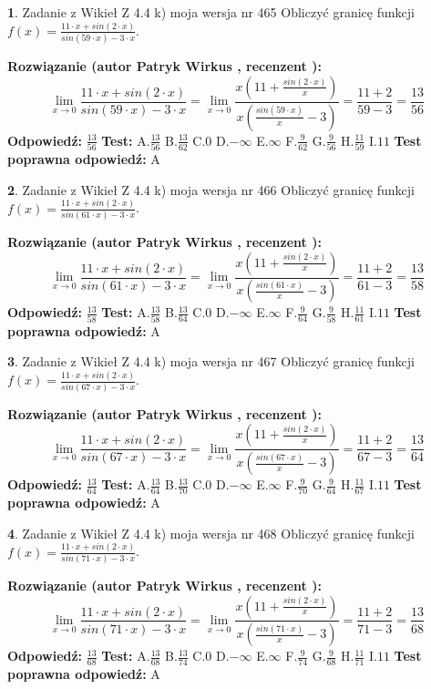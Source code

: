 \documentclass[12pt, a4paper]{article}
\theoremstyle{definition} %
\newtheorem{zad}{}
\newcommand{\zadStart}[1]{\begin{zad}#1\newline}
\newcommand{\zadStop}{\end{zad}}
\newcommand{\rozwStart}[2]{\noindent \textbf{Rozwiązanie (autor #1 , recenzent #2): }\newline}
\newcommand{\rozwStop}{\newline}
\newcommand{\odpStart}{\noindent \textbf{Odpowiedź:}\newline}
\newcommand{\odpStop}{\newline}
\newcommand{\testStart}{\noindent \textbf{Test:}\newline}
\newcommand{\testStop}{\newline}
\newcommand{\kluczStart}{\noindent \textbf{Test poprawna odpowiedź:}\newline}
\newcommand{\kluczStop}{\newline}
\begin{document}
\zadStart{Zadanie z Wikieł Z 4.4 k) moja wersja nr 465}
Obliczyć granicę funkcji $f(x)=\frac{11\cdot x +sin(2\cdot x)}{sin(59\cdot x) -3\cdot x}$.
\zadStop
\rozwStart{Patryk Wirkus}{}
$$\lim\limits_{x\to 0}\frac{11\cdot x +sin(2\cdot x)}{sin(59\cdot x) -3\cdot x}
=\lim\limits_{x\to 0}\frac{x(11+\frac{sin(2\cdot x)}{x})}{x(\frac{sin(59\cdot x)}{x}-3)}
=\frac{11+2}{59-3} = \frac{13}{56}$$
\rozwStop
\odpStart
$\frac{13}{56}$
\odpStop
\testStart
A.$\frac{13}{56}$
B.$\frac{13}{62}$
C.$0$
D.$-\infty$
E.$\infty$
F.$\frac{9}{62}$
G.$\frac{9}{56}$
H.$\frac{11}{59}$
I.$11$
\testStop
\kluczStart
A
\kluczStop



\zadStart{Zadanie z Wikieł Z 4.4 k) moja wersja nr 466}
Obliczyć granicę funkcji $f(x)=\frac{11\cdot x +sin(2\cdot x)}{sin(61\cdot x) -3\cdot x}$.
\zadStop
\rozwStart{Patryk Wirkus}{}
$$\lim\limits_{x\to 0}\frac{11\cdot x +sin(2\cdot x)}{sin(61\cdot x) -3\cdot x}
=\lim\limits_{x\to 0}\frac{x(11+\frac{sin(2\cdot x)}{x})}{x(\frac{sin(61\cdot x)}{x}-3)}
=\frac{11+2}{61-3} = \frac{13}{58}$$
\rozwStop
\odpStart
$\frac{13}{58}$
\odpStop
\testStart
A.$\frac{13}{58}$
B.$\frac{13}{64}$
C.$0$
D.$-\infty$
E.$\infty$
F.$\frac{9}{64}$
G.$\frac{9}{58}$
H.$\frac{11}{61}$
I.$11$
\testStop
\kluczStart
A
\kluczStop



\zadStart{Zadanie z Wikieł Z 4.4 k) moja wersja nr 467}
Obliczyć granicę funkcji $f(x)=\frac{11\cdot x +sin(2\cdot x)}{sin(67\cdot x) -3\cdot x}$.
\zadStop
\rozwStart{Patryk Wirkus}{}
$$\lim\limits_{x\to 0}\frac{11\cdot x +sin(2\cdot x)}{sin(67\cdot x) -3\cdot x}
=\lim\limits_{x\to 0}\frac{x(11+\frac{sin(2\cdot x)}{x})}{x(\frac{sin(67\cdot x)}{x}-3)}
=\frac{11+2}{67-3} = \frac{13}{64}$$
\rozwStop
\odpStart
$\frac{13}{64}$
\odpStop
\testStart
A.$\frac{13}{64}$
B.$\frac{13}{70}$
C.$0$
D.$-\infty$
E.$\infty$
F.$\frac{9}{70}$
G.$\frac{9}{64}$
H.$\frac{11}{67}$
I.$11$
\testStop
\kluczStart
A
\kluczStop



\zadStart{Zadanie z Wikieł Z 4.4 k) moja wersja nr 468}
Obliczyć granicę funkcji $f(x)=\frac{11\cdot x +sin(2\cdot x)}{sin(71\cdot x) -3\cdot x}$.
\zadStop
\rozwStart{Patryk Wirkus}{}
$$\lim\limits_{x\to 0}\frac{11\cdot x +sin(2\cdot x)}{sin(71\cdot x) -3\cdot x}
=\lim\limits_{x\to 0}\frac{x(11+\frac{sin(2\cdot x)}{x})}{x(\frac{sin(71\cdot x)}{x}-3)}
=\frac{11+2}{71-3} = \frac{13}{68}$$
\rozwStop
\odpStart
$\frac{13}{68}$
\odpStop
\testStart
A.$\frac{13}{68}$
B.$\frac{13}{74}$
C.$0$
D.$-\infty$
E.$\infty$
F.$\frac{9}{74}$
G.$\frac{9}{68}$
H.$\frac{11}{71}$
I.$11$
\testStop
\kluczStart
A
\kluczStop
\end{document}
